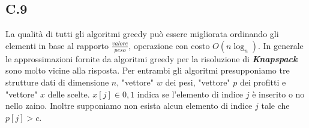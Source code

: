 \documentclass[a4paper]{article}
\newcommand{\imp}[1]{\textbf{\textit{#1}}}
\begin{document}
\subsection{C.9}
La qualità di tutti gli algoritmi greedy può essere migliorata ordinando gli elementi in base al rapporto $\frac{valore}{peso}$, operazione con costo $O(n\log_n)$.
In generale le approssimazioni fornite da algoritmi greedy per la risoluzione di \imp{Knapspack} sono molto vicine alla risposta. %
Per entrambi gli algoritmi presupponiamo tre strutture dati di dimensione $n$, "vettore" $w$ dei pesi, "vettore" $p$ dei profitti e "vettore" $x$ delle scelte. $x[j] \in {0,1}$ indica se l'elemento di indice $j$ è inserito o no nello zaino.
Inoltre supponiamo non esista alcun elemento di indice $j$ tale che $p[j] > c$.
\end{document}
